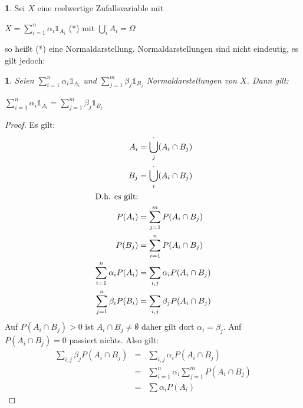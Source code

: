 \documentclass[10pt,a4paper]{report}
\numberwithin{equation}{section}
\numberwithin{figure}{section}
\theoremstyle{plain}
\theoremstyle{definition}
\newtheorem{defn}[thm]{\protect\definitionname}
\theoremstyle{remark}
\theoremstyle{plain}
\newtheorem{lem}[thm]{\protect\lemmaname}
\providecommand{\definitionname}{Definition}
\providecommand{\lemmaname}{Lemma}
\newcommand{\1}{ \mathbb{1} } %
\begin{document}
\begin{defn}  %
  Sei $X$ eine reelwertige Zufallsvariable mit
  \begin{center}
    $X=\sum\limits_{i=1}^n\alpha_i\1_{A_i}$ (*) mit $\bigcup_i^\cdot
    A_i=\Omega$
  \end{center}
  so heißt (*) eine Normaldarstellung. Normaldarstellungen sind nicht eindeutig, es gilt jedoch:
\end{defn}
\begin{lem}  %
  Seien $\sum\limits_{i=1}^n \alpha_i \1_{A_i}$ und
  $\sum\limits_{j=1}^m\beta_j\1_{B_j}$ Normaldarstellungen von
  $X$. Dann gilt:
  \begin{center}
    $\sum\limits_{i=1}^n \alpha_i
    \1_{A_i}=\sum\limits_{j=1}^m\beta_j\1_{B_j}$
  \end{center}
\end{lem}
\begin{proof}
  Es gilt: 
  \begin{align*}
    A_i&=\bigcup_j^\cdot (A_i\cap B_j)\\
    B_j&=\bigcup_i^\cdot (A_i\cap B_j)\\
    \intertext{D.h. es gilt: } 
    P(A_i)&=\sum\limits_{j=1}^mP(A_i\cap B_j)\\
    P(B_j)&=\sum\limits_{i=1}^nP(A_i\cap B_j)\\
    \sum\limits_{i=1}^n\alpha_iP(A_i)&=\sum\limits_{i,j}\alpha_iP(A_i\cap B_j)\\
    \sum\limits_{j=1}^n\beta_iP(B_i)&=\sum\limits_{i,j}\beta_jP(A_i\cap B_j)
  \end{align*}
  Auf $P(A_i\cap B_j)>0$ ist $A_i\cap B_j \neq \emptyset$ daher gilt
  dort $\alpha_i=\beta_j$. Auf $P(A_i\cap B_j)=0$ passiert
  nichts. Also gilt:
  \begin{eqnarray*}
    \sum\limits_{i,j}\beta_jP(A_i\cap B_j)&=&\sum\limits_{i,j}\alpha_iP(A_i\cap B_j)\\
    &=&\sum\limits_{i=1}^n\alpha_i\sum\limits_{j=1}^mP(A_i\cap B_j)\\
    &=&\sum\limits \alpha_i P(A_i)
  \end{eqnarray*}
\end{proof}
\end{document}
